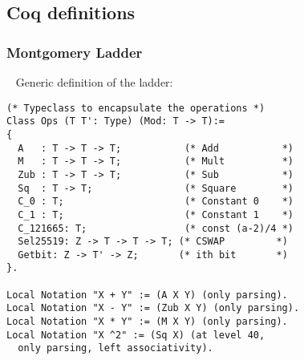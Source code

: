 \subsection{Coq definitions}
\label{appendix:coq}

\subsubsection{Montgomery Ladder}
\label{subsubsec:coq-ladder}
~
Generic definition of the ladder:

\begin{lstlisting}[language=Coq]
(* Typeclass to encapsulate the operations *)
Class Ops (T T': Type) (Mod: T -> T):=
{
  A   : T -> T -> T;           (* Add           *)
  M   : T -> T -> T;           (* Mult          *)
  Zub : T -> T -> T;           (* Sub           *)
  Sq  : T -> T;                (* Square        *)
  C_0 : T;                     (* Constant 0    *)
  C_1 : T;                     (* Constant 1    *)
  C_121665: T;                 (* const (a-2)/4 *)
  Sel25519: Z -> T -> T -> T; (* CSWAP         *)
  Getbit: Z -> T' -> Z;       (* ith bit       *)
}.

Local Notation "X + Y" := (A X Y) (only parsing).
Local Notation "X - Y" := (Zub X Y) (only parsing).
Local Notation "X * Y" := (M X Y) (only parsing).
Local Notation "X ^2" := (Sq X) (at level 40,
  only parsing, left associativity).


\end{lstlisting}
